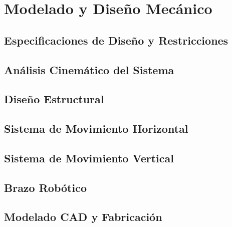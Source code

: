 \documentclass[a4paper,12pt]{report}
\begin{document}
\section{Modelado y Diseño Mecánico}

\subsection{Especificaciones de Diseño y Restricciones}


\subsection{Análisis Cinemático del Sistema}




\subsection{Diseño Estructural}

\subsection{Sistema de Movimiento Horizontal}




\subsection{Sistema de Movimiento Vertical}




\subsection{Brazo Robótico}




\subsection{Modelado CAD y Fabricación}
%


\end{document}
